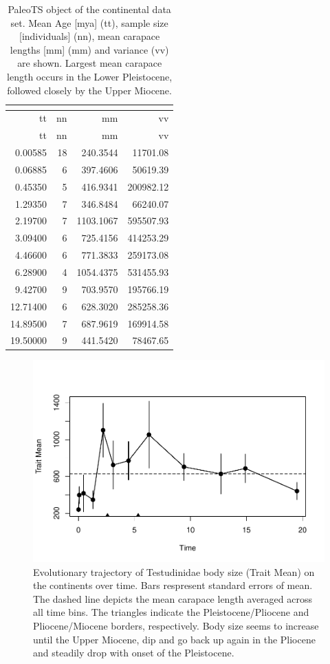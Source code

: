 \begin{longtable}[H]{@{}rrrr@{}}
	\caption[PaleoTS object of continental \T]{PaleoTS object of the continental data set. Mean Age [mya] (tt), sample size [individuals] (nn), mean carapace lengths [mm] (mm) and variance (vv) are shown. Largest mean carapace length occurs in the Lower Pleistocene, followed closely by the Upper Miocene.}
	\label{tab:pTSC}\tabularnewline
	\toprule
	tt & nn & mm & vv\tabularnewline
	\midrule
	\endfirsthead
	\toprule
	tt & nn & mm & vv\tabularnewline
	\midrule
	\endhead
	0.00585 & 18 & 240.3544 & 11701.08\tabularnewline
	0.06885 & 6 & 397.4606 & 50619.39\tabularnewline
	0.45350 & 5 & 416.9341 & 200982.12\tabularnewline
	1.29350 & 7 & 346.8484 & 66240.07\tabularnewline
	2.19700 & 7 & 1103.1067 & 595507.93\tabularnewline
	3.09400 & 6 & 725.4156 & 414253.29\tabularnewline
	4.46600 & 6 & 771.3833 & 259173.08\tabularnewline
	6.28900 & 4 & 1054.4375 & 531455.93\tabularnewline
	9.42700 & 9 & 703.9570 & 195766.19\tabularnewline
	12.71400 & 6 & 628.3020 & 285258.36\tabularnewline
	14.89500 & 7 & 687.9619 & 169914.58\tabularnewline
	19.50000 & 9 & 441.5420 & 78467.65\tabularnewline
	\bottomrule
\end{longtable}

\begin{figure}[H]
	\centering
	\includegraphics{MA_JJ_files/figure-latex/paleoTSC-1.pdf}
	\caption[PaleoTS plot of continental data set]{Evolutionary trajectory of Testudinidae body size (Trait Mean) on the continents over time. Bars respresent standard errors of mean. The dashed line depicts the mean carapace length averaged across all time bins. The triangles indicate the Pleistocene/Pliocene and Pliocene/Miocene borders, respectively. Body size seems to increase until the Upper Miocene, dip and go back up again in the Pliocene and steadily drop with onset of the Pleistocene.
	}
	\label{fig:pTSC}
\end{figure}

